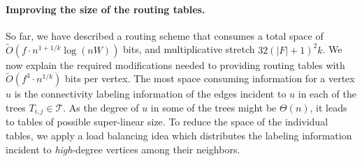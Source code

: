 

\paragraph{Improving the size of the routing tables.} 
So far, we have described a routing scheme that consumes a total space of $\widetilde{O}(f\cdot n^{1+1/k}\log (nW))$ bits, and multiplicative stretch %
$32(|F|+1)^2 k$. We now explain the required modifications needed to providing routing tables with $\widetilde{O}(f^3\cdot n^{1/k})$ bits per vertex. The most space consuming information for a vertex $u$ is the connectivity labeling
information of the edges incident to $u$ in each of the trees $T_{i,j} \in \mathcal{T}$. As the degree of $u$ in some of the trees might be $\Theta(n)$, it leads to tables of possible super-linear size. To reduce the space of the individual tables, we apply a load balancing idea which distributes the labeling information incident to \emph{high}-degree vertices among their neighbors. 

